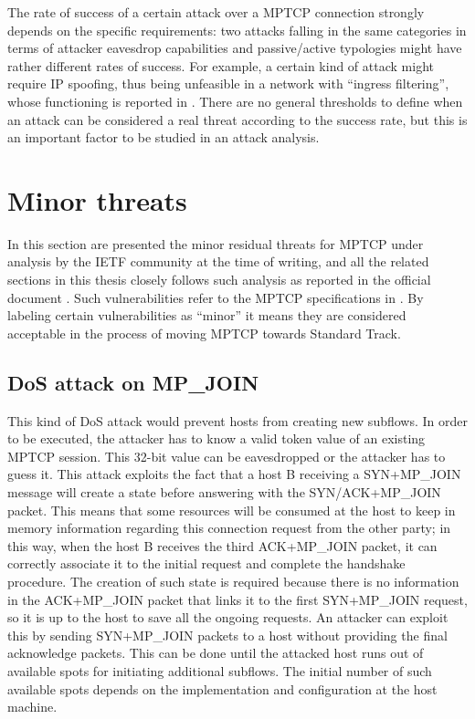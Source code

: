The rate of success of a certain attack over a MPTCP connection strongly depends on the specific requirements: two attacks falling in the same categories in terms of attacker eavesdrop capabilities and passive/active typologies might have rather different rates of success. For example, a certain kind of attack might require IP spoofing, thus being unfeasible in a network with ``ingress filtering'', whose functioning is reported in .
There are no general thresholds to define when an attack can be considered a real threat according to the success rate, but this is an important factor to be studied in an attack analysis.

\section{Minor threats}
In this section are presented the minor residual threats for MPTCP under analysis by the IETF community at the time of writing, and all the related sections in this thesis closely follows such analysis as reported in the official document . Such vulnerabilities refer to the MPTCP specifications in . By labeling certain vulnerabilities as ``minor'' it means they are considered acceptable in the process of moving MPTCP towards Standard Track. 

\subsection{DoS attack on MP\_JOIN}
This kind of DoS attack would prevent hosts from creating new subflows. In order to be executed, the attacker has to know a valid token value of an existing MPTCP session. This 32-bit value can be eavesdropped or the attacker has to guess it.
This attack exploits the fact that a host B receiving a SYN+MP\_JOIN message will create a state before answering with the SYN/ACK+MP\_JOIN packet. This means that some resources will be consumed at the host to keep in memory information regarding this connection request from the other party; in this way, when the host B receives the third ACK+MP\_JOIN packet, it can correctly associate it to the initial request and complete the handshake procedure. The creation of such state is required because there is no information in the ACK+MP\_JOIN packet that links it to the first SYN+MP\_JOIN request, so it is up to the host to save all the ongoing requests.
An attacker can exploit this by sending SYN+MP\_JOIN packets to a host without providing the final acknowledge packets. This can be done until the attacked host runs out of available spots for initiating additional subflows. The initial number of such available spots depends on the implementation and configuration at the host machine. 

